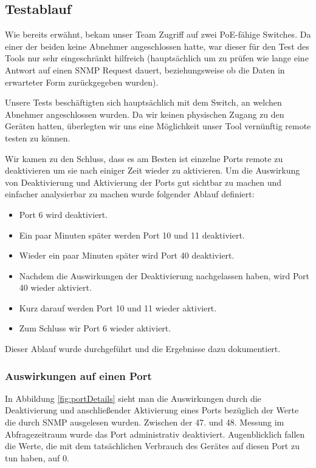 \subsection{Testablauf}
Wie bereits erwähnt, bekam unser Team Zugriff auf zwei PoE-fähige Switches. Da einer der beiden keine Abnehmer angeschlossen hatte, war dieser für den Test des Tools nur sehr eingeschränkt hilfreich (hauptsächlich um zu prüfen wie lange eine Antwort auf einen SNMP Request dauert, beziehungsweise ob die Daten in erwarteter Form zurückgegeben wurden).

Unsere Tests beschäftigten sich hauptsächlich mit dem Switch, an welchen Abnehmer angeschlossen wurden. Da wir keinen physischen Zugang zu den Geräten hatten, überlegten wir uns eine Möglichkeit unser Tool vernünftig remote testen zu können.

Wir kamen zu den Schluss, dass es am Besten ist einzelne Ports remote zu deaktivieren um sie nach einiger Zeit wieder zu aktivieren. Um die Auswirkung von Deaktivierung und Aktivierung der Ports gut sichtbar zu machen und einfacher analysierbar zu machen wurde folgender Ablauf definiert:

\begin{itemize}
 \item Port 6 wird deaktiviert.
 \item Ein paar Minuten später werden Port 10 und 11 deaktiviert.
 \item Wieder ein paar Minuten später wird Port 40 deaktiviert.
 \item Nachdem die Auswirkungen der Deaktivierung nachgelassen haben, wird Port 40 wieder aktiviert.
 \item Kurz darauf werden Port 10 und 11 wieder aktiviert.
 \item Zum Schluss wir Port 6 wieder aktiviert.
\end{itemize}

Dieser Ablauf wurde durchgeführt und die Ergebnisse dazu dokumentiert.

\subsubsection{Auswirkungen auf einen Port}
In Abbildung \ref{fig:portDetails} sieht man die Auswirkungen durch die Deaktivierung und anschließender Aktivierung eines Ports bezüglich der Werte die durch SNMP ausgelesen wurden. Zwischen der 47. und 48. Messung im Abfragezeitraum wurde das Port administrativ deaktiviert. Augenblicklich fallen die Werte, die mit dem tatsächlichen Verbrauch des Gerätes auf diesen Port zu tun haben, auf 0. 

